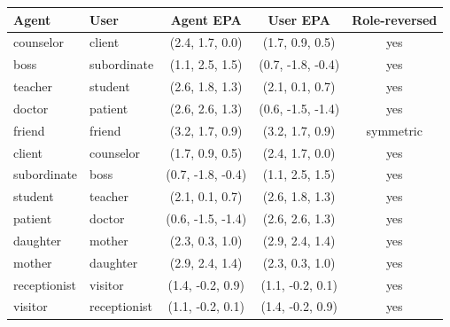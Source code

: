 \begin{tabular}{llccc}
\toprule
Agent & User & Agent EPA & User EPA & Role-reversed \\
\midrule
counselor & client & (2.4, 1.7, 0.0) & (1.7, 0.9, 0.5) & yes \\
boss & subordinate & (1.1, 2.5, 1.5) & (0.7, -1.8, -0.4) & yes \\
teacher & student & (2.6, 1.8, 1.3) & (2.1, 0.1, 0.7) & yes \\
doctor & patient & (2.6, 2.6, 1.3) & (0.6, -1.5, -1.4) & yes \\
friend & friend & (3.2, 1.7, 0.9) & (3.2, 1.7, 0.9) & symmetric \\
client & counselor & (1.7, 0.9, 0.5) & (2.4, 1.7, 0.0) & yes \\
subordinate & boss & (0.7, -1.8, -0.4) & (1.1, 2.5, 1.5) & yes \\
student & teacher & (2.1, 0.1, 0.7) & (2.6, 1.8, 1.3) & yes \\
patient & doctor & (0.6, -1.5, -1.4) & (2.6, 2.6, 1.3) & yes \\
daughter & mother & (2.3, 0.3, 1.0) & (2.9, 2.4, 1.4) & yes \\
mother & daughter & (2.9, 2.4, 1.4) & (2.3, 0.3, 1.0) & yes \\
receptionist & visitor & (1.4, -0.2, 0.9) & (1.1, -0.2, 0.1) & yes \\
visitor & receptionist & (1.1, -0.2, 0.1) & (1.4, -0.2, 0.9) & yes \\
\bottomrule
\end{tabular}
